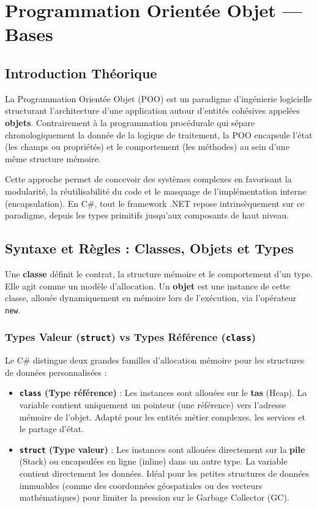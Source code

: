 \section{Programmation Orientée Objet — Bases}

\subsection{Introduction Théorique}

La Programmation Orientée Objet (POO) est un paradigme d'ingénierie logicielle structurant l'architecture d'une application autour d'entités cohésives appelées \textbf{objets}. Contrairement à la programmation procédurale qui sépare chronologiquement la donnée de la logique de traitement, la POO encapsule l'état (les champs ou propriétés) et le comportement (les méthodes) au sein d'une même structure mémoire.

Cette approche permet de concevoir des systèmes complexes en favorisant la modularité, la réutilisabilité du code et le masquage de l'implémentation interne (encapsulation). En C\#, tout le framework .NET repose intrinsèquement sur ce paradigme, depuis les types primitifs jusqu'aux composants de haut niveau.

\subsection{Syntaxe et Règles : Classes, Objets et Types}

Une \textbf{classe} définit le contrat, la structure mémoire et le comportement d'un type. Elle agit comme un modèle d'allocation. Un \textbf{objet} est une instance de cette classe, allouée dynamiquement en mémoire lors de l'exécution, via l'opérateur \texttt{new}.

\subsubsection{Types Valeur (\texttt{struct}) vs Types Référence (\texttt{class})}

Le C\# distingue deux grandes familles d'allocation mémoire pour les structures de données personnalisées :
\begin{itemize}
    \item \textbf{\texttt{class} (Type référence)} : Les instances sont allouées sur le \textbf{tas} (Heap). La variable contient uniquement un pointeur (une référence) vers l'adresse mémoire de l'objet. Adapté pour les entités métier complexes, les services et le partage d'état.
    \item \textbf{\texttt{struct} (Type valeur)} : Les instances sont allouées directement sur la \textbf{pile} (Stack) ou encapsulées en ligne (inline) dans un autre type. La variable contient directement les données. Idéal pour les petites structures de données immuables (comme des coordonnées géospatiales ou des vecteurs mathématiques) pour limiter la pression sur le Garbage Collector (GC).
\end{itemize}

